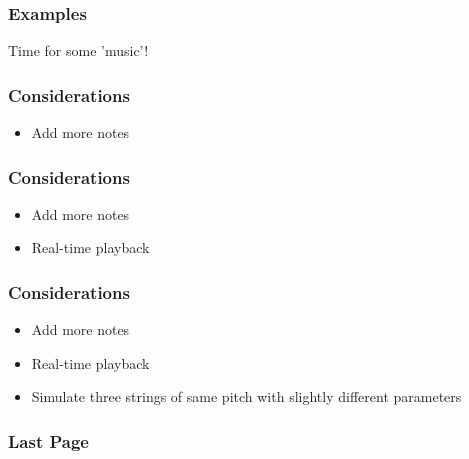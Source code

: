 \documentclass{beamer}
\begin{document}
\begin{frame}\frametitle{Examples}
Time for some 'music'!
\end{frame}

\begin{frame}\frametitle{Considerations}
\begin{itemize}
\item Add more notes
\end{itemize}
\end{frame}


\begin{frame}\frametitle{Considerations}
\begin{itemize}
\item Add more notes
\item Real-time playback
\end{itemize}
\end{frame}

\begin{frame}\frametitle{Considerations}
\begin{itemize}
\item Add more notes
\item Real-time playback
\item Simulate three strings of same pitch with slightly different parameters
\end{itemize}
\end{frame}


\begin{frame}\frametitle{Last Page}
\end{frame}
\end{document}
